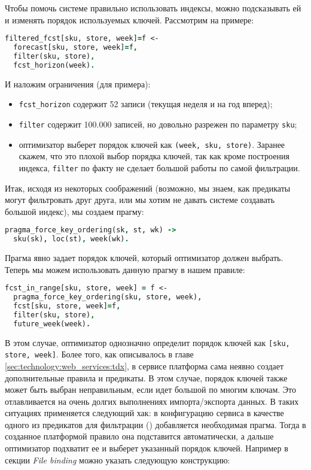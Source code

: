 Чтобы помочь системе правильно использовать индексы, можно подсказывать ей и изменять порядок используемых ключей. Рассмотрим на примере:

\begin{lstlisting}[language=Prolog]
filtered_fcst[sku, store, week]=f <-
  forecast[sku, store, week]=f,
  filter(sku, store),
  fcst_horizon(week).
\end{lstlisting}

И наложим ограничения (для примера):

\begin{itemize}
  \item \lstinline{fcst_horizon} содержит 52 записи (текущая неделя и на год вперед);
  \item \lstinline{filter} содержит 100.000 записей, но довольно разрежен по параметру \lstinline{sku};
  \item оптимизатор выберет порядок ключей как \lstinline{(week, sku, store)}. Заранее скажем, что это плохой выбор порядка ключей, так как кроме построения индекса, \lstinline{filter} по факту не сделает большой работы по самой фильтрации.
\end{itemize}

Итак, исходя из некоторых соображений (возможно, мы знаем, как предикаты могут фильтровать друг друга, или мы хотим не давать системе создавать большой индекс), мы создаем прагму:

\begin{lstlisting}[language=Prolog]
pragma_force_key_ordering(sk, st, wk) ->
  sku(sk), loc(st), week(wk).
\end{lstlisting}

Прагма явно задает порядок ключей, который оптимизатор должен выбрать. Теперь мы можем использовать данную прагму в нашем правиле:

\begin{lstlisting}[language=Prolog]
fcst_in_range[sku, store, week] = f <-
  pragma_force_key_ordering(sku, store, week),
  fcst[sku, store, week]=f,
  filter(sku, store),
  future_week(week).
\end{lstlisting}

В этом случае, оптимизатор однозначно определит порядок ключей как \lstinline{[sku, store, week]}. Более того, как описывалось в главе \ref{sec:technology:web_services:tdx}, в \tdx сервисе платформа сама неявно создает дополнительные правила и предикаты. В этом случае, порядок ключей также может быть выбран неправильным, если идет большой \join по многим ключам. Это отлавливается на очень долгих выполнениях импорта/экспорта данных. В таких ситуациях применяется следующий хак: в конфигурацию \tdx сервиса в качестве одного из предикатов для фильтрации (\join) добавляется необходимая прагма. Тогда в созданное платформой правило она подставится автоматически, а дальше оптимизатор подхватит ее и выберет указанный порядок ключей. Например в секции \emph{File binding} можно указать следующую конструкцию:

